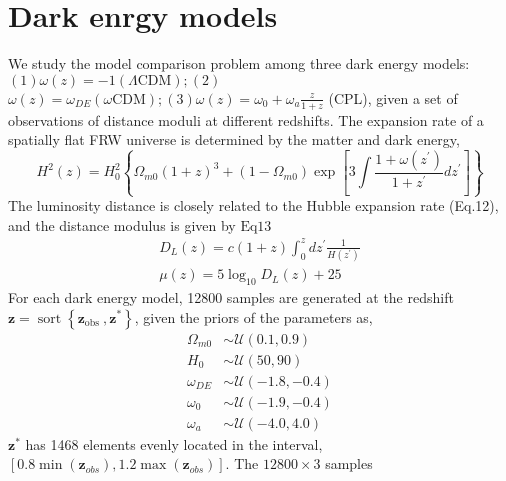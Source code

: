 \section{Dark enrgy models}
We study the model comparison problem among three dark energy models: $(1) \omega(z)=-1(\Lambda \mathrm{CDM}) ;(2)$ $\omega(z)=\omega_{D E}(\omega \mathrm{CDM}) ;(3) \omega(z)=\omega_{0}+\omega_{a} \frac{z}{1+z}$ (CPL), given a set of observations of distance moduli at different redshifts. The expansion rate of a spatially flat FRW universe is determined by the matter and dark energy,
$$
H^{2}(z)=H_{0}^{2}\left\{\Omega_{m 0}(1+z)^{3}+\left(1-\Omega_{m 0}\right) \exp \left[3 \int \frac{1+\omega\left(z^{\prime}\right)}{1+z^{\prime}} d z^{\prime}\right]\right\}
$$
The luminosity distance is closely related to the Hubble expansion rate (Eq.12), and the distance modulus is given by $\mathrm{Eq} 13$
$$
\begin{gathered}
D_{L}(z)=c(1+z) \int_{0}^{z} d z^{\prime} \frac{1}{H\left(z^{\prime}\right)} \\
\mu(z)=5 \log _{10} D_{L}(z)+25
\end{gathered}
$$
For each dark energy model, 12800 samples are generated at the redshift $\boldsymbol{z}=\operatorname{sort}\left\{\boldsymbol{z}_{\text {obs }}, \boldsymbol{z}^{*}\right\}$, given the priors of the parameters as,
$$
\begin{aligned}
\Omega_{m 0} & \sim \mathcal{U}(0.1,0.9) \\
H_{0} & \sim \mathcal{U}(50,90) \\
\omega_{D E} & \sim \mathcal{U}(-1.8,-0.4) \\
\omega_{0} & \sim \mathcal{U}(-1.9,-0.4) \\
\omega_{a} & \sim \mathcal{U}(-4.0,4.0)
\end{aligned}
$$
$\boldsymbol{z}^{*}$ has 1468 elements evenly located in the interval, $\left[0.8 \min \left(\boldsymbol{z}_{o b s}\right), 1.2 \max \left(\boldsymbol{z}_{o b s}\right)\right]$. The $12800 \times 3$ samples